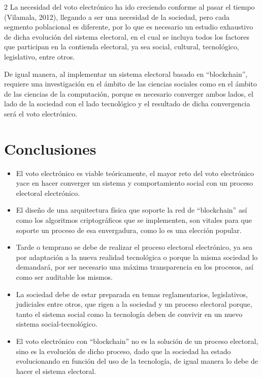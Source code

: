 \documentclass[12pt,spanish,Letterpaper,openany]{book}
\begin{document}
\begin {multicols}{2}
La necesidad del voto electrónico ha ido creciendo conforme al pasar el tiempo (Vilamala, 2012), llegando a ser una necesidad de la sociedad, pero cada segmento poblacional es diferente, por lo que es necesario un estudio exhaustivo de dicha evolución del sistema electoral, en el cual se incluya todos los factores que participan en la contienda electoral, ya sea social, cultural, tecnológico, legislativo, entre otros.

De igual manera, al implementar un sistema electoral basado en ``blockchain'', requiere una investigación en el ámbito de las ciencias sociales como en el ámbito de las ciencias de la computación, porque es necesario converger ambos lados, el lado de la sociedad con el lado tecnológico y el resultado de dicha convergencia será el voto electrónico.

\hypertarget{conclusiones-1}{%
\section{Conclusiones}\label{conclusiones-1}}

\begin{itemize}
\item
  El voto electrónico es viable teóricamente, el mayor reto del voto electrónico yace en hacer converger un sistema y comportamiento social con un proceso electoral electrónico.
\item
  El diseño de una arquitectura física que soporte la red de ``blockchain'' así como los algoritmos criptográficos que se implementen, son vitales para que soporte un proceso de esa envergadura, como lo es una elección popular.
\item
  Tarde o temprano se debe de realizar el proceso electoral electrónico, ya sea por adaptación a la nueva realidad tecnológica o porque la misma sociedad lo demandará, por ser necesario una máxima transparencia en los procesos, así como ser auditable los mismos.
\item
  La sociedad debe de estar preparada en temas reglamentarios, legislativos, judiciales entre otros, que rigen a la sociedad y un proceso electoral porque, tanto el sistema social como la tecnología deben de convivir en un nuevo sistema social-tecnológico.
\item
  El voto electrónico con ``blockchain'' no es la solución de un proceso electoral, sino es la evolución de dicho proceso, dado que la sociedad ha estado evolucionando en función del uso de la tecnología, de igual manera lo debe de hacer el sistema electoral.
\end{itemize}


\end{multicols}
\end{document}
